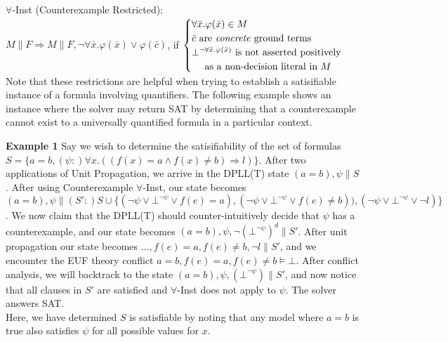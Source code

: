 \documentclass{llncs}
\begin{document}
\noindent $\forall$-Inst (Counterexample Restricted): \\

$M \parallel F \Longrightarrow M \parallel F, \neg \forall \bar{x}. \varphi( \bar{ x } ) \vee \varphi( \bar{ c } )$, if   
$\begin{cases}
  \forall \bar{x}. \varphi( \bar{ x } ) \in M \\
  \bar{ c } \text{ are \emph{concrete} ground terms} \\
  \bot^{\neg \forall \bar{x}. \varphi( \bar{ x } )} \text{ is not asserted positively }\\
  \text{ \ \ \ as a non-decision literal in $M$ } \\    
\end{cases}$ \\

Note that these restrictions are helpful when trying to establish a satisifiable instance of a formula involving quantifiers.
The following example shows an instance where the solver may return SAT by determining that a counterexample cannot exist to a universally quantified formula in a particular context.

{\bf Example 1}
Say we wish to determine the satisifiability of the set of formulas $S = \{ a = b, (\psi :) \forall x. ((f(x) = a \wedge f(x) \neq b) \Rightarrow l) \}$.
After two applications of Unit Propagation, we arrive in the DPLL(T) state $( a = b ), \psi \parallel S$.
After using Counterexample $\forall$-Inst, our state becomes $( a = b ), \psi \parallel (S':) S \cup \{ (\neg \psi \vee \bot^{\neg \psi} \vee f( e ) = a), (\neg \psi \vee \bot^{\neg \psi} \vee f( e ) \neq b)), (\neg \psi \vee \bot^{\neg \psi} \vee \neg l) \}$.
We now claim that the DPLL(T) should counter-intuitively decide that $\psi$ has a counterexample, and our state becomes $( a = b ), \psi, \neg (\bot^{\neg \psi})^d \parallel S'$. 
After unit propagation our state becomes $\ldots, f( e ) = a, f( e ) \neq b, \neg l \parallel S'$, and we encounter the EUF theory conflict $a = b, f( e ) = a, f( e ) \neq b \models \bot$.
After conflict analysis, we will backtrack to the state $( a = b ), \psi, (\bot^{\neg \psi}) \parallel S'$, and now notice that all clauses in $S'$ are satisfied and $\forall$-Inst does not apply to $\psi$.
The solver answers SAT. \\

Here, we have determined $S$ is satisfiable by noting that any model where $a = b$ is true also satisfies $\psi$ for all possible values for $x$.
\end{document}
